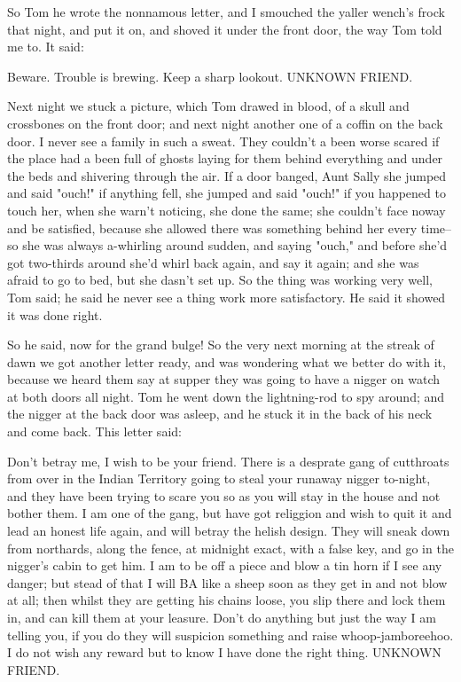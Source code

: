 So Tom he wrote the nonnamous letter, and I smouched the yaller wench's
frock that night, and put it on, and shoved it under the front door, the
way Tom told me to.  It said:

Beware.  Trouble is brewing.  Keep a sharp lookout. UNKNOWN FRIEND.

Next night we stuck a picture, which Tom drawed in blood, of a skull and
crossbones on the front door; and next night another one of a coffin on
the back door.  I never see a family in such a sweat.  They couldn't a
been worse scared if the place had a been full of ghosts laying for them
behind everything and under the beds and shivering through the air.  If a
door banged, Aunt Sally she jumped and said "ouch!" if anything fell, she
jumped and said "ouch!" if you happened to touch her, when she warn't
noticing, she done the same; she couldn't face noway and be satisfied,
because she allowed there was something behind her every time--so she was
always a-whirling around sudden, and saying "ouch," and before she'd got
two-thirds around she'd whirl back again, and say it again; and she was
afraid to go to bed, but she dasn't set up.  So the thing was working
very well, Tom said; he said he never see a thing work more satisfactory.
He said it showed it was done right.

So he said, now for the grand bulge!  So the very next morning at the
streak of dawn we got another letter ready, and was wondering what we
better do with it, because we heard them say at supper they was going to
have a nigger on watch at both doors all night.  Tom he went down the
lightning-rod to spy around; and the nigger at the back door was asleep,
and he stuck it in the back of his neck and come back.  This letter said:

Don't betray me, I wish to be your friend.  There is a desprate gang of
cutthroats from over in the Indian Territory going to steal your runaway
nigger to-night, and they have been trying to scare you so as you will
stay in the house and not bother them.  I am one of the gang, but have
got religgion and wish to quit it and lead an honest life again, and will
betray the helish design. They will sneak down from northards, along the
fence, at midnight exact, with a false key, and go in the nigger's cabin
to get him. I am to be off a piece and blow a tin horn if I see any
danger; but stead of that I will BA like a sheep soon as they get in and
not blow at all; then whilst they are getting his chains loose, you slip
there and lock them in, and can kill them at your leasure.  Don't do
anything but just the way I am telling you, if you do they will suspicion
something and raise whoop-jamboreehoo. I do not wish any reward but to
know I have done the right thing. UNKNOWN FRIEND.




